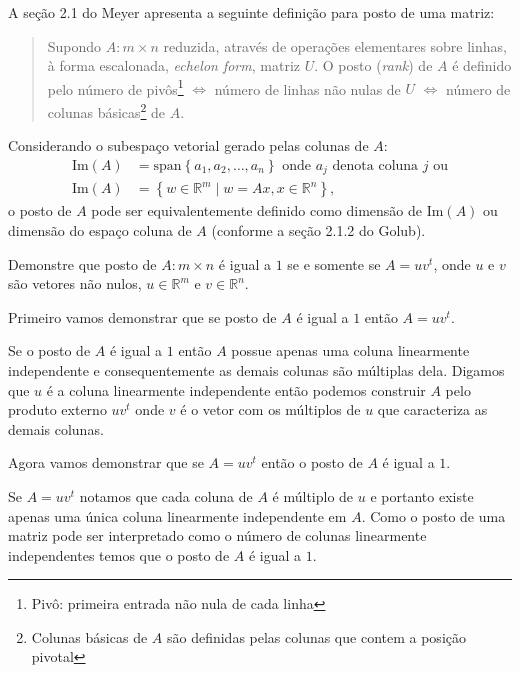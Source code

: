 \documentclass[a4paper,12pt, leqno, answers]{exam}
\begin{document}
\begin{questions}
     A se\c{c}\~{a}o 2.1 do Meyer\nocite{Meyer:2000:matrix} apresenta a seguinte defini\c{c}\~{a}o para posto de uma matriz:
    \begin{quote}
        Supondo $A : m \times n$ reduzida, atrav\'{e}s de opera\c{c}\~{o}es elementares sobre linhas, \`{a} forma escalonada, \textit{echelon form}, matriz $U$. O posto (\textit{rank}) de $A$ \'{e} definido pelo n\'{u}mero de piv\^{o}s\footnote{Piv\^{o}: primeira entrada n\~{a}o nula de cada linha} $\Leftrightarrow$ n\'{u}mero de linhas n\~{a}o nulas de $U$ $\Leftrightarrow$ n\'{u}mero de colunas b\'{a}sicas\footnote{Colunas b\'{a}sicas de $A$ s\~{a}o definidas pelas colunas que contem a posi\c{c}\~{a}o pivotal} de $A$.
    \end{quote}

    Considerando o subespa\c{c}o vetorial gerado pelas colunas de $A$:
    \begin{align*}
        \mbox{Im} (A) &= \mbox{span} \left\{ a_1, a_2, \ldots, a_n \right\} \mbox{ onde $a_j$ denota coluna $j$ ou} \\
        \mbox{Im} (A) &= \left\{ w \in \mathbb{R}^m \mid w = A x, x \in \mathbb{R}^n \right\},
    \end{align*}
    o posto de $A$ pode ser equivalentemente definido como dimens\~{a}o de $\mbox{Im} (A)$ ou dimens\~{a}o do espa\c{c}o coluna de $A$ (conforme a se\c{c}\~{a}o 2.1.2 do Golub\nocite{Golub:1996:matrix}).

     Demonstre que posto de $A : m \times n$ \'{e} igual a $1$ se e somente se $A = u v^t$, onde $u$ e $v$ s\~{a}o vetores n\~{a}o nulos, $u \in \mathbb{R}^m$ e $v \in \mathbb{R}^n$.
    \begin{solution}
        Primeiro vamos demonstrar que se posto de $A$ \'{e} igual a $1$ ent\~{a}o $A = u v^t$.
        
        Se o posto de $A$ \'{e} igual a $1$ ent\~{a}o $A$ possue apenas uma coluna linearmente independente e consequentemente as demais colunas s\~{a}o m\'{u}ltiplas dela. Digamos que $u$ \'{e} a coluna linearmente independente ent\~{a}o podemos construir $A$ pelo produto externo $u v^t$ onde $v$ \'{e} o vetor com os m\'{u}ltiplos de $u$ que caracteriza as demais colunas.

        Agora vamos demonstrar que se $A = u v^t$ ent\~{a}o o posto de $A$ \'{e} igual a $1$. 

        Se $A = u v^t$ notamos que cada coluna de $A$ \'{e} m\'{u}ltiplo de $u$ e portanto existe apenas uma \'{u}nica coluna linearmente independente em $A$. Como o posto de uma matriz pode ser interpretado como o n\'{u}mero de colunas linearmente independentes temos que o posto de $A$ \'{e} igual a $1$.
    \end{solution}


\end{questions}
\end{document}
